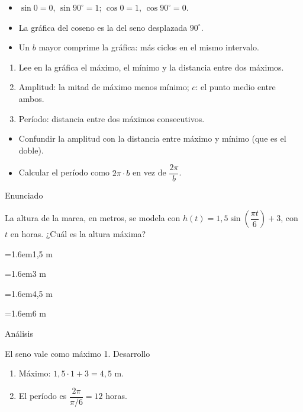 \documentclass[10pt,a4paper,twocolumn]{article}
\newcommand{\alternativa}[2]{\par\noindent\hangindent=1.6em\hangafter=1\makebox[1.6em][l]{\tecla{#1}}#2\par}
\newcommand{\clave}[1]{\par\smallskip{\sffamily\footnotesize\color{esmeralda} Clave \teclaok{#1}}\par}
\begin{document}
\begin{ideasclave}
\begin{itemize}
  \item $\sin 0=0$, $\sin 90^\circ=1$; $\cos 0=1$, $\cos 90^\circ=0$.
  \item La gráfica del coseno es la del seno desplazada $90^\circ$.
  \item Un $b$ mayor comprime la gráfica: más ciclos en el mismo intervalo.
\end{itemize}
\end{ideasclave}

\begin{metodo}
\begin{enumerate}
  \item Lee en la gráfica el máximo, el mínimo y la distancia entre dos máximos.
  \item Amplitud: la mitad de máximo menos mínimo; $c$: el punto medio entre ambos.
  \item Período: distancia entre dos máximos consecutivos.
\end{enumerate}
\end{metodo}

\begin{errorfrecuente}
\begin{itemize}
  \item Confundir la amplitud con la distancia entre máximo y mínimo (que es el doble).
  \item Calcular el período como $2\pi\cdot b$ en vez de $\dfrac{2\pi}{b}$.
\end{itemize}
\end{errorfrecuente}

\begin{ejemplo}
{\sffamily\footnotesize\color{zinc500} Enunciado}\par
La altura de la marea, en metros, se modela con $h(t)=1{,}5\sin\!\left(\dfrac{\pi t}{6}\right)+3$, con $t$ en horas. ¿Cuál es la altura máxima?
\alternativa{A}{1,5 m}
\alternativa{B}{3 m}
\alternativa{C}{4,5 m}
\alternativa{D}{6 m}
\clave{C}
{\sffamily\footnotesize\color{zinc500} Análisis}\par El seno vale como máximo 1.
{\sffamily\footnotesize\color{zinc500} Desarrollo}
\begin{enumerate}
  \item Máximo: $1{,}5\cdot 1+3=4{,}5$ m.
  \item El período es $\dfrac{2\pi}{\pi/6}=12$ horas.
\end{enumerate}
\end{ejemplo}
\end{document}
